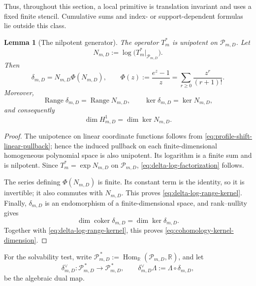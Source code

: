 \documentclass[11pt]{amsart}
\theoremstyle{plain}
\newtheorem{lemma}[theorem]{Lemma}
\theoremstyle{definition}
\theoremstyle{remark}
\numberwithin{equation}{section}
\theoremstyle{plain}
\begin{document}
Thus, throughout this section, a local primitive is translation invariant
and uses a fixed finite stencil.  Cumulative sums and index- or
support-dependent formulas lie outside this class.

\begin{lemma}[The nilpotent generator]
	\label{lem:profile-exactness}
	The operator $T_m^*$ is unipotent on $\mathscr P_{m,D}$.  Let
	\[
	N_{m,D}
	:=\log\bigl(T_m^*|_{\mathscr P_{m,D}}\bigr).
	\]
	Then
	\begin{equation}\label{eq:delta-log-factorization}
		\delta_{m,D}
		=N_{m,D}\Phi(N_{m,D}),
		\qquad
		\Phi(z):=\frac{e^z-1}{z}
		=\sum_{r\ge0}\frac{z^r}{(r+1)!}.
	\end{equation}
	Moreover,
	\begin{equation}\label{eq:delta-log-range-kernel}
		\operatorname{Range}\delta_{m,D}
		=\operatorname{Range}N_{m,D},
		\qquad
		\ker\delta_{m,D}=\ker N_{m,D},
	\end{equation}
	and consequently
	\begin{equation}\label{eq:cohomology-kernel-dimension}
		\dim H^1_{m,D}=\dim\ker N_{m,D}.
	\end{equation}
\end{lemma}

\begin{proof}
	The unipotence on linear coordinate functions follows from
	\eqref{eq:profile-shift-linear-pullback}; hence the induced pullback on each
	finite-dimensional homogeneous polynomial space is also unipotent.  Its
	logarithm is a finite sum and is nilpotent.  Since
	$T_m^*=\exp N_{m,D}$ on $\mathscr P_{m,D}$,
	\eqref{eq:delta-log-factorization} follows.
	
	The series defining $\Phi(N_{m,D})$ is finite.  Its constant term is the
	identity, so it is invertible; it also commutes with $N_{m,D}$.  This proves
	\eqref{eq:delta-log-range-kernel}.  Finally, $\delta_{m,D}$ is an
	endomorphism of a finite-dimensional space, and rank--nullity gives
	\[
	\dim\operatorname{coker}\delta_{m,D}
	=\dim\ker\delta_{m,D}.
	\]
	Together with \eqref{eq:delta-log-range-kernel}, this proves
	\eqref{eq:cohomology-kernel-dimension}.
\end{proof}

For the solvability test, write
$\mathscr P_{m,D}^{\,*}:=\operatorname{Hom}_{\mathbb R}
(\mathscr P_{m,D},\mathbb R)$, and let
\begin{equation}\label{eq:algebraic-dual-coboundary}
	\delta_{m,D}^{\vee}:
	\mathscr P_{m,D}^{\,*}\longrightarrow\mathscr P_{m,D}^{\,*},
	\qquad
	\delta_{m,D}^{\vee}\Lambda:=\Lambda\circ\delta_{m,D},
\end{equation}
be the algebraic dual map.
\end{document}
